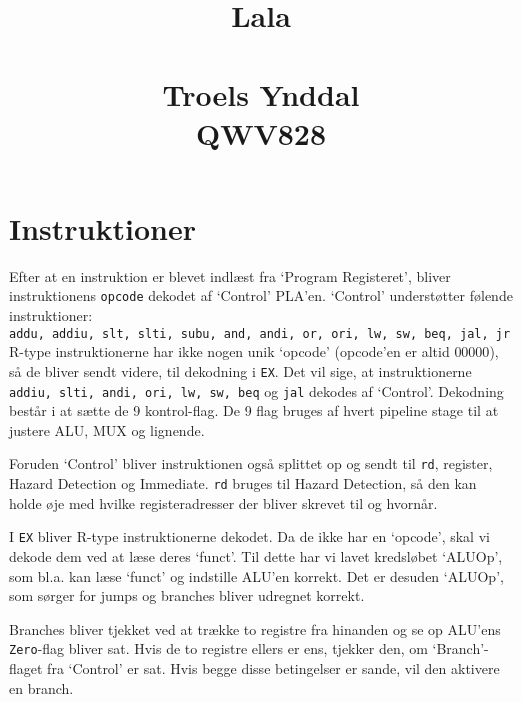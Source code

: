 \documentclass[12pt, a4paper]{article}
\title{Lala\\~\\
	\Large{Troels Ynddal\\ QWV828}}
\begin{document}
\maketitle
\newpage


\begin{comment}
I skal skrive en rapport, hvor I kort beskriver jeres pipeline (ca. 1-2 sider).
I skal redegøre for hvilke instruktioner I har fået til at virke og eventuelle instruktioner, som I ikke har fået til at virke.
I sidste tilfælde skal I kort beskrive hvorfor I tror, at de ikke virker, og hvad man evt. kunne gøre for at få det til at virke.
Det samme gælder hazard detection og forwarding.
Sidst men ikke mindst skal jeres rapport indeholde en beskrivelse af jeres tests med forventet output og faktisk output.
\end{comment}

\section{Instruktioner}
Efter at en instruktion er blevet indlæst fra `Program Registeret', bliver instruktionens \texttt{opcode} dekodet af `Control' PLA'en. `Control' understøtter følende instruktioner:\\
\texttt{addu, addiu, slt, slti, subu, and, andi, or, ori, lw, sw, beq, jal, jr}\\

R-type instruktionerne har ikke nogen unik `opcode' (opcode'en er altid $00000$), så de bliver sendt videre, til dekodning i \texttt{EX}.
Det vil sige, at instruktionerne \texttt{addiu, slti, andi, ori, lw, sw, beq} og \texttt{jal} dekodes af `Control'. Dekodning består i at sætte de 9 kontrol-flag. De 9 flag bruges af hvert pipeline stage til at justere ALU, MUX og lignende. 

Foruden `Control' bliver instruktionen også splittet op og sendt til \texttt{rd}, register, Hazard Detection og Immediate. \texttt{rd} bruges til Hazard Detection, så den kan holde øje med hvilke registeradresser der bliver skrevet til og hvornår.

I \texttt{EX} bliver R-type instruktionerne dekodet. Da de ikke har en `opcode', skal vi dekode dem ved at læse deres `funct'. Til dette har vi lavet kredsløbet `ALUOp', som bl.a. kan læse `funct' og indstille ALU'en korrekt. Det er desuden `ALUOp', som sørger for jumps og branches bliver udregnet korrekt.

Branches bliver tjekket ved at trække to registre fra hinanden og se op ALU'ens \texttt{Zero}-flag bliver sat. Hvis de to registre ellers er ens, tjekker den, om `Branch'-flaget fra `Control' er sat. Hvis begge disse betingelser er sande, vil den aktivere en branch.
\end{document}
